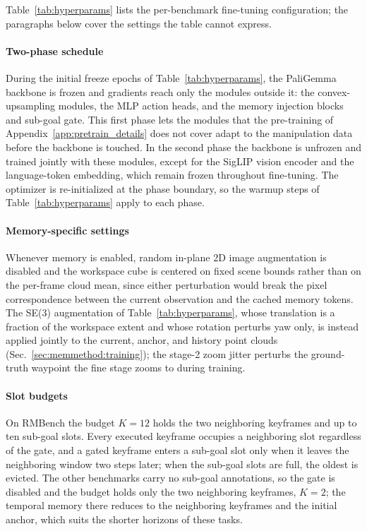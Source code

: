Table~\ref{tab:hyperparams} lists the per-benchmark fine-tuning
configuration; the paragraphs below cover the settings the table
cannot express.

\paragraph{Two-phase schedule}
During the initial freeze epochs of Table~\ref{tab:hyperparams}, the
PaliGemma backbone is frozen and gradients reach only the modules
outside it: the convex-upsampling modules, the MLP action heads, and
the memory injection blocks and sub-goal gate.
This first phase lets the modules that the pre-training of
Appendix~\ref{app:pretrain_details} does not cover adapt to the
manipulation data before the backbone is touched.
In the second phase the backbone is unfrozen and trained jointly with
these modules, except for the SigLIP vision encoder and the
language-token embedding, which remain frozen throughout fine-tuning.
The optimizer is re-initialized at the phase boundary, so the warmup
steps of Table~\ref{tab:hyperparams} apply to each phase.

\paragraph{Memory-specific settings}
Whenever memory is enabled, random in-plane 2D image augmentation is
disabled and the workspace cube is centered on fixed scene bounds
rather than on the per-frame cloud mean, since either perturbation
would break the pixel correspondence between the current observation
and the cached memory tokens.
The SE(3) augmentation of Table~\ref{tab:hyperparams}, whose
translation is a fraction of the workspace extent and whose rotation
perturbs yaw only, is instead applied jointly to the current, anchor,
and history point clouds (Sec.~\ref{sec:memmethod:training}); the
stage-2 zoom jitter perturbs the ground-truth waypoint the fine stage
zooms to during training.

\paragraph{Slot budgets}
On RMBench the budget $K{=}12$ holds the two neighboring keyframes and
up to ten sub-goal slots.
Every executed keyframe occupies a neighboring slot regardless of the
gate, and a gated keyframe enters a sub-goal slot only when it leaves
the neighboring window two steps later; when the sub-goal slots are
full, the oldest is evicted.
The other benchmarks carry no sub-goal annotations, so the gate is
disabled and the budget holds only the two neighboring keyframes,
$K{=}2$; the temporal memory there reduces to the neighboring
keyframes and the initial anchor, which suits the shorter horizons of
these tasks.

